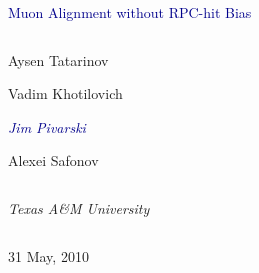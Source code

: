 \documentclass[compress]{beamer}
\begin{document}
\begin{frame}
\vfill
\begin{center}
\textcolor{darkblue}{\Large Muon Alignment without RPC-hit Bias}

\vfill
\begin{columns}
\begin{center}
\large
Aysen Tatarinov

Vadim Khotilovich

\textcolor{darkblue}{\it Jim Pivarski}

Alexei Safonov
\end{center}
\end{columns}

\begin{columns}
\begin{center}
\scriptsize
{\it Texas A\&M University}
\end{center}
\end{columns}

\vfill
31 May, 2010

\end{center}
\end{frame}


\small
\end{document}

